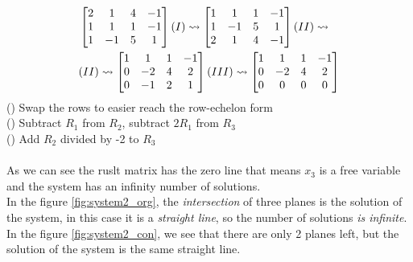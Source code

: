 \documentclass[14pt, letterpaper, fleqn]{extarticle}
\newcommand{\RomanNumeralCaps}[1]
    {\MakeUppercase{\romannumeral #1}}
\begin{document}
\begin{enumerate}
\begin{equation*}
	      	\begin{split}
	      		& \begin{bmatrix}
	      		2 & 1 & 4 & -1 \\
	      		1 & 1 & 1 & -1 \\
	      		1 & -1 & 5 & 1
	      		\end{bmatrix}
	      		(\RomanNumeralCaps{1}) \leadsto
	      		\begin{bmatrix}
	      			1 & 1  & 1 & -1 \\
	      			1 & -1 & 5 & 1  \\
	      			2 & 1  & 4 & -1 
	      		\end{bmatrix}
	      		(\RomanNumeralCaps{2}) \leadsto \\
	      		&(\RomanNumeralCaps{2}) \leadsto
				\begin{bmatrix}
	      			1 & 1  & 1 & -1 \\
	      			0 & -2 & 4 & 2  \\
	      			0 & -1 & 2 & 1  
	      		\end{bmatrix}
	      		(\RomanNumeralCaps{3}) \leadsto
	      		\begin{bmatrix}
	      			1 & 1  & 1 & -1 \\
	      			0 & -2 & 4 & 2  \\
	      			0 & 0  & 0 & 0  
	      		\end{bmatrix}
	      	\end{split}
	      \end{equation*}
	      (\RomanNumeralCaps{1}) Swap the rows to easier reach the row-echelon form \\
	      (\RomanNumeralCaps{2}) Subtract $R_1$ from $R_2$, subtract $2R_1$ from $R_3$ \\
	      (\RomanNumeralCaps{3})	Add $R_2$ divided by -2 to $R_3$ \\\\
	      As we can see the ruslt matrix has the zero line that means $x_3$ is a free variable and the system has an infinity 				number of solutions.\\
		\newpage
	      In the figure \ref{fig:system2_org}, the \textit{intersection} of three planes is the solution of 				the system, in this case it is a \textit{straight line}, so the number of solutions \textit{is infinite}. In the figure \ref{fig:system2_con}, we see that there are 				only 2 planes left, but the solution of the system is the same straight line.
		 \vspace{1cm}
	      \begin{figure}[H]

\end{figure}
\end{enumerate}
\end{document}
